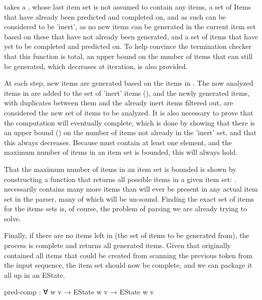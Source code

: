		 takes a , whose last item set is not
		assumed to contain any items, a set of Items that have already been
		predicted and completed on, and as such can be considered to be
		'inert', as no new items can be generated in the current item set based
		on these that have not already been generated, and a set of items that
		have yet to be completed and predicted on. To help convince the
		termination checker that this function is total, an upper bound on the
		number of items that can still be generated, which decreases at
		iteration, is also provided.

		At each step, new items are generated based on the items in
		. The now analyzed items in  are added to the set
		of 'inert' items (), and the newly generated items, with
		duplicates between them and the already inert items filtered out, are
		considered the new set of items to be analyzed. It is also necessary to
		prove that the computation will eventually complete, which is done by
		showing that there is an upper bound () on the number of
		items not already in the 'inert' set, and that this always decreases.
		Because  must contain at least one element, and the maximum
		number of items in an item set is bounded, this will always hold.

		That the maximum number of items in an item set is bounded is shown by
		constructing a function that returns all possible items in a given item
		set: .  necessarily contains many
		more items than will ever be present in any actual item set in the
		parser, many of which will be un-sound. Finding the exact set of items
		for the items sets is, of course, the problem of parsing we are already
		trying to solve.

		Finally, if there are no items left in  (the set of items to
		be generated from), the process is complete and 
		returns all generated items. Given that  originally
		contained all items that could be created from scanning the previous
		token from the input sequence, the item set should now be complete, and
		we can package it all up in an EState.

		\begin{code}
			  pred-comp : ∀ {w v} →
			    EState w v → EState w v
		\end{code}

